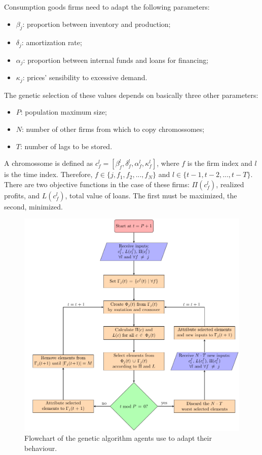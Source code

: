 \documentclass[11pt,]{article}
\makeatletter
\def\maxwidth{\ifdim\Gin@nat@width>\linewidth\linewidth
\else\Gin@nat@width\fi}
\let\Oldincludegraphics\includegraphics
\renewcommand{\includegraphics}[1]{\Oldincludegraphics[width=\maxwidth]{#1}}
\providecommand{\tightlist}{%
\setlength{\itemsep}{0pt}\setlength{\parskip}{0pt}}
\makeatother
\begin{document}
Consumption goods firms need to adapt the following parameters:

\begin{itemize}
\tightlist
\item
  \(\beta_j\): proportion between inventory and production;
\item
  \(\delta_j\): amortization rate;
\item
  \(\alpha_j\): proportion between internal funds and loans for
  financing;
\item
  \(\kappa_j\): prices' sensibility to excessive demand.
\end{itemize}

The genetic selection of these values depends on basically three other
parameters:

\begin{itemize}
\tightlist
\item
  \(P\): population maximum size;
\item
  \(N\): number of other firms from which to copy chromossomes;
\item
  \(T\): number of lags to be stored.
\end{itemize}

A chromossome is defined as
\(c_f^l = [\beta_f^l, \delta_f^l, \alpha_f^l, \kappa_f^l]\), where \(f\)
is the firm index and \(l\) is the time index. Therefore,
\(f \in \{j, f_1, f_2,...,f_N\}\) and \(l \in \{t-1,t-2,...,t-T\}\).
There are two objective functions in the case of these firms:
\(\Pi(c_f^l)\), realized profits, and \(L(c_f^l)\), total value of
loans. The first must be maximized, the second, minimized.

\begin{figure}
\centering
\includegraphics{AG.pdf}
\caption{Flowchart of the genetic algorithm agents use to adapt their
behaviour.}
\end{figure}
\end{document}
